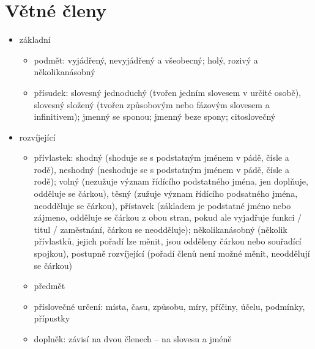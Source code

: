 \documentclass{memoir}
\begin{document}
\section*{Větné členy}
\begin{itemize}
\item základní
\begin{itemize}
\item podmět: vyjádřený, nevyjádřený a všeobecný; holý, rozivý a několikanásobný
\item přísudek: slovesný jednoduchý (tvořen jedním slovesem v určité osobě), slovesný složený (tvořen způsobovým nebo fázovým slovesem a infinitivem); jmenný se sponou; jmenný beze spony; citoslovečný
\end{itemize}
\item rozvíjející
\begin{itemize}
\item přívlastek: shodný (shoduje se s podstatným jménem v pádě, čísle a rodě), neshodný (neshoduje se s podstatným jménem v pádě, čísle a rodě); volný (nezužuje význam řídícího podstatného jména, jen doplňuje, odděluje se čárkou), těsný (zužuje význam řídícího podsatného jména, neodděluje se čárkou), přístavek (základem je podstatné jméno nebo zájmeno, odděluje se čárkou z obou stran, pokud ale vyjadřuje funkci / titul / zaměstnání, čárkou se neodděluje); několikanásobný (několik přívlastků, jejich pořadí lze měnit, jsou odděleny čárkou nebo souřadící spojkou), postupně rozvíjející (pořadí členů není možné měnit, neoddělují se čárkou)
\item předmět
\item příslovečné určení: místa, času, způsobu, míry, příčiny, účelu, podmínky, přípustky
\item doplněk: závisí na dvou členech -- na slovesu a jméně
\end{itemize}
\end{itemize}
\end{document}
